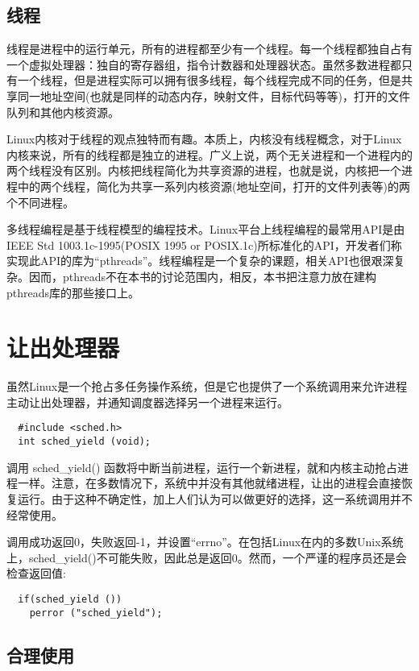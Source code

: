 \subsection{线程}

线程是进程中的运行单元，所有的进程都至少有一个线程。每一个线程都独自占有一个虚拟处理器：独自的寄存器组，指令计数器和处理器状态。虽然多数进程都只有一个线程，但是进程实际可以拥有很多线程，每个线程完成不同的任务，但是共享同一地址空间(也就是同样的动态内存，映射文件，目标代码等等)，打开的文件队列和其他内核资源。

Linux内核对于线程的观点独特而有趣。本质上，内核没有线程概念，对于Linux内核来说，所有的线程都是独立的进程。广义上说，两个无关进程和一个进程内的两个线程没有区别。内核把线程简化为共享资源的进程，也就是说，内核把一个进程中的两个线程，简化为共享一系列内核资源(地址空间，打开的文件列表等)的两个不同进程。

多线程编程是基于线程模型的编程技术。Linux平台上线程编程的最常用API是由IEEE Std 1003.1c-1995(POSIX 1995 or POSIX.1c)所标准化的API，开发者们称实现此API的库为“pthreads”。线程编程是一个复杂的课题，相关API也很艰深复杂。因而，pthreads不在本书的讨论范围内，相反，本书把注意力放在建构pthreads库的那些接口上。

\section{让出处理器}

虽然Linux是一个抢占多任务操作系统，但是它也提供了一个系统调用来允许进程主动让出处理器，并通知调度器选择另一个进程来运行。
\begin{lstlisting}
  #include <sched.h>
  int sched_yield (void);
\end{lstlisting}

调用 sched\_yield() 函数将中断当前进程，运行一个新进程，就和内核主动抢占进程一样。注意，在多数情况下，系统中并没有其他就绪进程，让出的进程会直接恢复运行。由于这种不确定性，加上人们认为可以做更好的选择，这一系统调用并不经常使用。

调用成功返回0，失败返回-1，并设置“errno”。在包括Linux在内的多数Unix系统上，sched\_yield()不可能失败，因此总是返回0。然而，一个严谨的程序员还是会检查返回值:

\begin{lstlisting}
  if(sched_yield ())
    perror ("sched_yield");
\end{lstlisting}

\subsection{合理使用}

